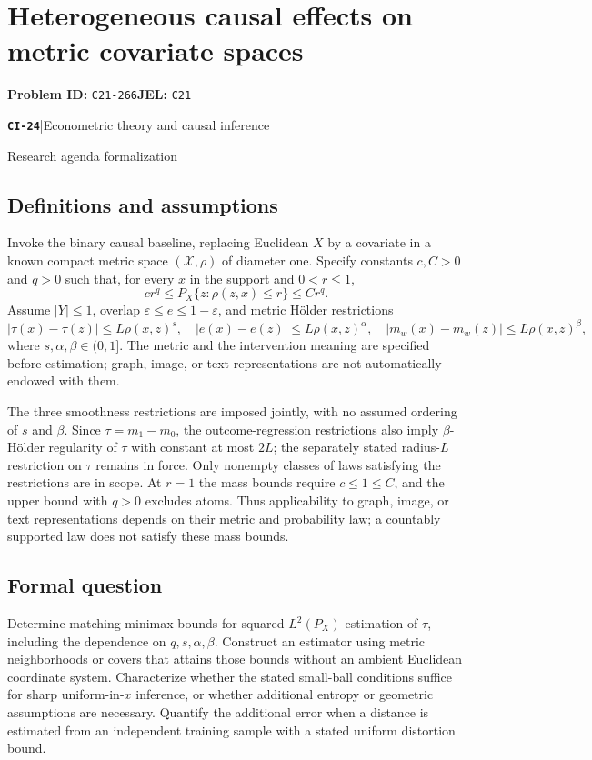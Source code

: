 \documentclass[11pt,a4paper]{article}
\newcommand{\entrymeta}[3]{{\sffamily\small\color{muted}\textbf{\texttt{#1}}\quad|\quad #2\par #3\par}}
\begin{document}
\section*{Heterogeneous causal effects on metric covariate spaces}
\textbf{Problem ID:} \texttt{C21-266}\quad \textbf{JEL:} \texttt{C21}\par
\label{problem:OP-0503}
\label{beyond:CI-24}
\entrymeta{CI-24}{Econometric theory and causal inference}{Research agenda formalization}
\subsection*{Definitions and assumptions}
Invoke the binary causal baseline, replacing Euclidean $X$ by a covariate in a known compact metric space $(\mathcal X,\rho)$ of diameter one. Specify constants $c,C>0$ and $q>0$ such that, for every $x$ in the support and $0<r\leq1$,
\[
 cr^q\leq P_X\{z:\rho(z,x)\leq r\}\leq Cr^q.
\]
Assume $|Y|\leq1$, overlap $\varepsilon\leq e\leq1-\varepsilon$, and metric H\"older restrictions
\[
 |\tau(x)-\tau(z)|\leq L\rho(x,z)^s,
 \quad |e(x)-e(z)|\leq L\rho(x,z)^\alpha,
 \quad |m_w(x)-m_w(z)|\leq L\rho(x,z)^\beta,
\]
where $s,\alpha,\beta\in(0,1]$. The metric and the intervention meaning are specified before estimation; graph, image, or text representations are not automatically endowed with them.

The three smoothness restrictions are imposed jointly, with no assumed ordering of $s$ and $\beta$. Since $\tau=m_1-m_0$, the outcome-regression restrictions also imply $\beta$-H\"older regularity of $\tau$ with constant at most $2L$; the separately stated radius-$L$ restriction on $\tau$ remains in force. Only nonempty classes of laws satisfying the restrictions are in scope. At $r=1$ the mass bounds require $c\leq1\leq C$, and the upper bound with $q>0$ excludes atoms. Thus applicability to graph, image, or text representations depends on their metric and probability law; a countably supported law does not satisfy these mass bounds.
\subsection*{Formal question}
Determine matching minimax bounds for squared $L^2(P_X)$ estimation of $\tau$, including the dependence on $q,s,\alpha,\beta$. Construct an estimator using metric neighborhoods or covers that attains those bounds without an ambient Euclidean coordinate system. Characterize whether the stated small-ball conditions suffice for sharp uniform-in-$x$ inference, or whether additional entropy or geometric assumptions are necessary. Quantify the additional error when a distance is estimated from an independent training sample with a stated uniform distortion bound.
\end{document}
